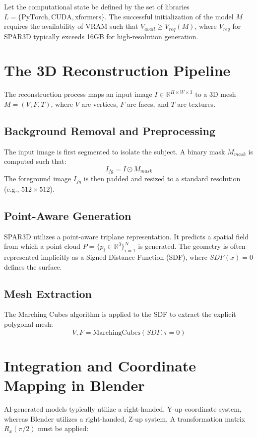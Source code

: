\documentclass[10pt,journal,compsoc]{IEEEtran}
\begin{document}
Let the computational state be defined by the set of libraries $L = \{ \text{PyTorch}, \text{CUDA}, \text{xformers} \}$. The successful initialization of the model $M$ requires the availability of VRAM such that $V_{avail} \ge V_{req}(M)$, where $V_{req}$ for SPAR3D typically exceeds 16GB for high-resolution generation.

\section{The 3D Reconstruction Pipeline}
The reconstruction process maps an input image $I \in \mathbb{R}^{H \times W \times 3}$ to a 3D mesh $M = (V, F, T)$, where $V$ are vertices, $F$ are faces, and $T$ are textures.

\subsection{Background Removal and Preprocessing}
The input image is first segmented to isolate the subject. A binary mask $M_{mask}$ is computed such that:
\[ I_{fg} = I \odot M_{mask} \]
The foreground image $I_{fg}$ is then padded and resized to a standard resolution (e.g., $512 \times 512$).

\subsection{Point-Aware Generation}
SPAR3D utilizes a point-aware triplane representation. It predicts a spatial field from which a point cloud $P = \{p_i \in \mathbb{R}^3\}_{i=1}^N$ is generated. 
The geometry is often represented implicitly as a Signed Distance Function (SDF), where $SDF(x) = 0$ defines the surface.

\subsection{Mesh Extraction}
The Marching Cubes algorithm is applied to the SDF to extract the explicit polygonal mesh:
\[ V, F = \text{MarchingCubes}(SDF, \tau=0) \]

\section{Integration and Coordinate Mapping in Blender}
AI-generated models typically utilize a right-handed, Y-up coordinate system, whereas Blender utilizes a right-handed, Z-up system. A transformation matrix $R_x(\pi/2)$ must be applied:
\end{document}

